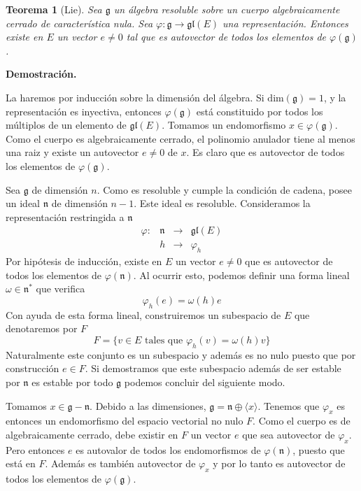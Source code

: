 \documentclass[a4paper,draft,12pt]{article}
\newtheorem{teo}{Teorema}[section]%
\newcommand{\dem}{\noindent \textbf{Demostración. }\vspace{0.3 cm}}%
\newcommand{\g}{\mathfrak{g}}%
\newcommand{\lto}{\longrightarrow}%
\begin{document}
\begin{teo}[Lie]

Sea $\g$ un álgebra resoluble sobre un cuerpo algebraicamente cerrado de característica nula.  Sea $\varphi:\g \rightarrow \mathfrak{gl}(E)$ una representación.  Entonces existe en $E$ un vector $e \neq 0$ tal que es autovector de todos los elementos de $\varphi(\g)$.


\end{teo}

\dem

La haremos por inducción sobre la dimensión del álgebra.  Si $\mathrm{dim}(\g)=1$, y la representación es inyectiva, entonces $\varphi(\g)$ está constituido por todos los múltiplos de un elemento de $\mathfrak{gl}(E)$.  Tomamos un endomorfismo $x \in \varphi(\g)$.  Como el cuerpo es algebraicamente cerrado, el polinomio anulador tiene al menos una raiz y existe un autovector $e\neq 0$ de $x$.  Es claro que es autovector de todos los elementos de $\varphi(\g)$.

\bigskip

Sea $\g$ de dimensión $n$.  Como es resoluble y cumple la condición de cadena, posee un ideal $\mathfrak{n}$ de dimensión $n-1$. Este ideal es resoluble.  Consideramos la representación restringida a $\mathfrak{n}$
$$
\begin{array}{lccc}
\varphi :&\mathfrak{n}&\lto &\mathfrak{gl}(E)\\
         &  h &\lto & \varphi_h
\end{array}
$$
Por hipótesis de inducción, existe en $E$ un vector $e\neq 0$ que es autovector de todos los elementos de $\varphi(\mathfrak{n})$.  Al ocurrir esto, podemos definir una forma lineal $\omega \in \mathfrak{n}^*$ que verifica
$$
\varphi_h(e) = \omega(h)e
$$
Con ayuda de esta forma lineal, construiremos un subespacio de $E$ que denotaremos por $F$
$$
F=\{v \in E \text{ tales que } \varphi_h(v) = \omega(h)v \}
$$
Naturalmente este conjunto es un subespacio y además es no nulo puesto que por construcción $e \in F$.  Si demostramos que este subespacio además de ser estable por $\mathfrak{n}$ es estable por todo $\g$ podemos concluir del siguiente modo. 

 Tomamos $x \in \g -\mathfrak{n}$.  Debido a las dimensiones, $\g= \mathfrak{n}\oplus \langle x\rangle$.  Tenemos que $\varphi_x$ es entonces un endomorfismo del espacio vectorial no nulo $F$.  Como el cuerpo es de algebraicamente cerrado, debe existir en $F$ un vector $e$ que sea autovector  de $\varphi_x$.  Pero entonces $e$ es autovalor de todos los endomorfismos de $\varphi(\mathfrak{n})$, puesto que está en $F$.  Además es también autovector de $\varphi_x$ y por lo tanto es autovector de todos los elementos de $\varphi(\g)$.
\end{document}
